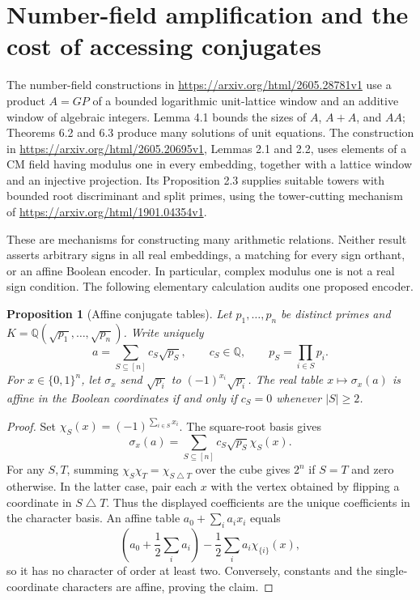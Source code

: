 \documentclass[11pt]{article}
\newtheorem{proposition}{Proposition}
\begin{document}
\section{Number-field amplification and the cost of accessing conjugates}

The number-field constructions in
\url{https://arxiv.org/html/2605.28781v1}
use a product $A=GP$ of a bounded logarithmic unit-lattice window and
an additive window of algebraic integers. Lemma 4.1 bounds the sizes of
$A$, $A+A$, and $AA$; Theorems 6.2 and 6.3 produce many solutions of
unit equations. The construction in
\url{https://arxiv.org/html/2605.20695v1}, Lemmas 2.1 and 2.2,
uses elements of a CM field having modulus one in every embedding,
together with a lattice window and an injective projection. Its
Proposition 2.3 supplies suitable towers with bounded root discriminant
and split primes, using the tower-cutting mechanism of
\url{https://arxiv.org/html/1901.04354v1}.

These are mechanisms for constructing many arithmetic relations.
Neither result asserts arbitrary signs in all real embeddings, a
matching for every sign orthant, or an affine Boolean encoder.
In particular, complex modulus one is not a real sign condition.
The following elementary calculation audits one proposed encoder.

\begin{proposition}[Affine conjugate tables]
Let $p_1,\ldots,p_n$ be distinct primes and
$K=\mathbb Q(\sqrt{p_1},\ldots,\sqrt{p_n})$.
Write uniquely
\[
 a=\sum_{S\subseteq[n]}c_S\sqrt{p_S},\qquad
 c_S\in\mathbb Q,\qquad p_S=\prod_{i\in S}p_i.
\]
For $x\in\{0,1\}^n$, let $\sigma_x$ send
$\sqrt{p_i}$ to $(-1)^{x_i}\sqrt{p_i}$.
The real table $x\mapsto\sigma_x(a)$ is affine in the Boolean
coordinates if and only if $c_S=0$ whenever $|S|\ge2$.
\end{proposition}
\begin{proof}
Set $\chi_S(x)=(-1)^{\sum_{i\in S}x_i}$.
The square-root basis gives
\[
 \sigma_x(a)=\sum_{S\subseteq[n]}c_S\sqrt{p_S}\chi_S(x).
\]
For any $S,T$, summing $\chi_S\chi_T=\chi_{S\mathbin\triangle T}$
over the cube gives $2^n$ if $S=T$ and zero otherwise. In the
latter case, pair each $x$ with the vertex obtained by flipping a
coordinate in $S\mathbin\triangle T$. Thus the displayed coefficients
are the unique coefficients in the character basis. An affine table
$a_0+\sum_i a_i x_i$ equals
\[
 \left(a_0+\frac12\sum_i a_i\right)
       -\frac12\sum_i a_i\chi_{\{i\}}(x),
\]
so it has no character of order at least two. Conversely, constants
and the single-coordinate characters are affine, proving the claim.
\end{proof}
\end{document}
